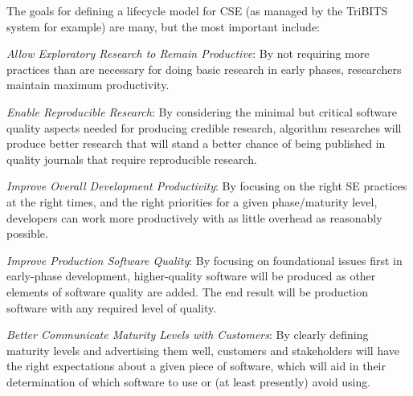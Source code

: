 \documentclass[11pt]{SANDreport}
\begin{document}
%
%
%

The goals for defining a lifecycle model for CSE (as managed by the
TriBITS system for example) are many, but the most important include:

\begin{compactitem}

{}\item\textit{Allow Exploratory Research to Remain Productive}: By
not requiring more practices than are necessary for doing basic
research in early phases, researchers maintain maximum productivity.

{}\item\textit{Enable Reproducible Research}: By considering the
minimal but critical software quality aspects needed for producing
credible research, algorithm researches will produce better research
that will stand a better chance of being published in quality journals
that require reproducible research.

{}\item\textit{Improve Overall Development Productivity}: By focusing
on the right SE practices at the right times, and the right priorities
for a given phase/maturity level, developers can work more
productively with as little overhead as reasonably possible.

{}\item\textit{Improve Production Software Quality}: By focusing on
foundational issues first in early-phase development, higher-quality
software will be produced as other elements of software quality are
added.  The end result will be production software with any required
level of quality.

{}\item\textit{Better Communicate Maturity Levels with Customers}: By
clearly defining maturity levels and advertising them well,
customers and stakeholders will have the right expectations about a
given piece of software, which will  aid in their determination of which
software to use or (at least presently) avoid using.

\end{compactitem}
\end{document}
